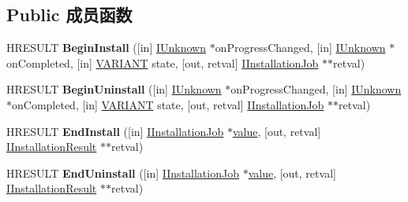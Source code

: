 \subsection*{Public 成员函数}
\begin{DoxyCompactItemize}
\item 
\mbox{\label{interface_w_u_api_lib_1_1_i_update_installer_afa349287590181458fa034665c3fafba}} 
H\+R\+E\+S\+U\+LT {\bfseries Begin\+Install} (\mbox{[}in\mbox{]} \hyperlink{interface_i_unknown}{I\+Unknown} $\ast$on\+Progress\+Changed, \mbox{[}in\mbox{]} \hyperlink{interface_i_unknown}{I\+Unknown} $\ast$on\+Completed, \mbox{[}in\mbox{]} \hyperlink{structtag_v_a_r_i_a_n_t}{V\+A\+R\+I\+A\+NT} state, \mbox{[}out, retval\mbox{]} \hyperlink{interface_w_u_api_lib_1_1_i_installation_job}{I\+Installation\+Job} $\ast$$\ast$retval)
\item 
\mbox{\label{interface_w_u_api_lib_1_1_i_update_installer_aa05641575743ef79449c92de64570c34}} 
H\+R\+E\+S\+U\+LT {\bfseries Begin\+Uninstall} (\mbox{[}in\mbox{]} \hyperlink{interface_i_unknown}{I\+Unknown} $\ast$on\+Progress\+Changed, \mbox{[}in\mbox{]} \hyperlink{interface_i_unknown}{I\+Unknown} $\ast$on\+Completed, \mbox{[}in\mbox{]} \hyperlink{structtag_v_a_r_i_a_n_t}{V\+A\+R\+I\+A\+NT} state, \mbox{[}out, retval\mbox{]} \hyperlink{interface_w_u_api_lib_1_1_i_installation_job}{I\+Installation\+Job} $\ast$$\ast$retval)
\item 
\mbox{\label{interface_w_u_api_lib_1_1_i_update_installer_aa8565f88da8dc09e56e82b190ebb944d}} 
H\+R\+E\+S\+U\+LT {\bfseries End\+Install} (\mbox{[}in\mbox{]} \hyperlink{interface_w_u_api_lib_1_1_i_installation_job}{I\+Installation\+Job} $\ast$\hyperlink{unionvalue}{value}, \mbox{[}out, retval\mbox{]} \hyperlink{interface_w_u_api_lib_1_1_i_installation_result}{I\+Installation\+Result} $\ast$$\ast$retval)
\item 
\mbox{\label{interface_w_u_api_lib_1_1_i_update_installer_afdef98ef97fcb1b48b8bb830128d38de}} 
H\+R\+E\+S\+U\+LT {\bfseries End\+Uninstall} (\mbox{[}in\mbox{]} \hyperlink{interface_w_u_api_lib_1_1_i_installation_job}{I\+Installation\+Job} $\ast$\hyperlink{unionvalue}{value}, \mbox{[}out, retval\mbox{]} \hyperlink{interface_w_u_api_lib_1_1_i_installation_result}{I\+Installation\+Result} $\ast$$\ast$retval)

\end{DoxyCompactItemize}

